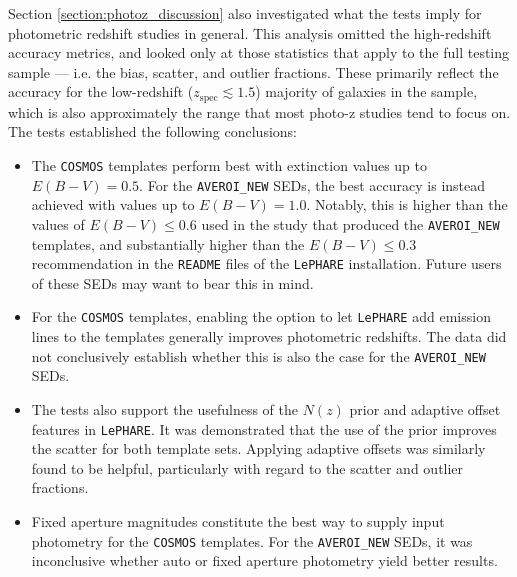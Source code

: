 Section \ref{section:photoz_discussion} also investigated what the \DESVIDEO tests imply for photometric redshift studies in general. This analysis omitted the high-redshift accuracy metrics, and looked only at those statistics that apply to the full testing sample --- i.e. the bias, scatter, and outlier fractions. These primarily reflect the accuracy for the low-redshift ($z_{\mathrm{spec}}\lesssim1.5$) majority of galaxies in the sample, which is also approximately the range that most photo-z studies tend to focus on. The \DESVIDEO tests established the following conclusions: %


\begin{itemize}
    \item The \texttt{COSMOS} templates perform best with extinction values up to $E(B-V) = 0.5$. For the \texttt{AVEROI\_NEW} SEDs, the best accuracy is instead achieved with values up to $E(B-V) = 1.0$. Notably, this is higher than the values of $E(B-V) \leq 0.6$ used in the \cite{2007A&A...476..137A} study that produced the \texttt{AVEROI\_NEW} templates, and substantially higher than the $E(B-V) \leq 0.3$ recommendation in the \texttt{README} files of the \texttt{LePHARE} installation. Future users of these SEDs may want to bear this in mind. 
    

    \item For the \texttt{COSMOS} templates, enabling the option to let \texttt{LePHARE} add emission lines to the templates generally improves photometric redshifts. The data did not conclusively establish whether this is also the case for the \texttt{AVEROI\_NEW} SEDs.
    
    \item  The \DESVIDEO tests also support the usefulness of the $N(z)$ prior and adaptive offset features in \texttt{LePHARE}. It was demonstrated that the use of the prior improves the scatter for both template sets. Applying adaptive offsets was similarly found to be helpful, particularly with regard to the scatter and outlier fractions.
    
    \item Fixed aperture magnitudes constitute the best way to supply input photometry for the \texttt{COSMOS} templates. For the \texttt{AVEROI\_NEW} SEDs, it was inconclusive whether auto or fixed aperture photometry yield better results. 
    

\end{itemize}
